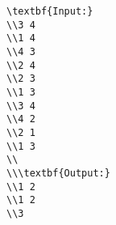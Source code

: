 \begin{verbatim}
\textbf{Input:}
\\3 4
\\1 4
\\4 3
\\2 4
\\2 3
\\1 3
\\3 4
\\4 2
\\2 1
\\1 3
\\
\\\textbf{Output:}
\\1 2
\\1 2
\\3\end{verbatim}